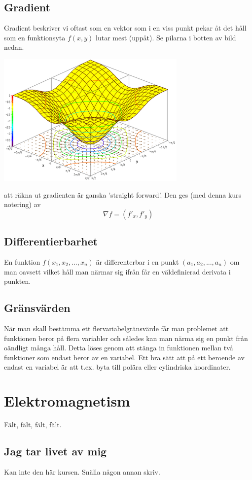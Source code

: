 \documentclass[10pt,a4paper]{article}
\begin{document}
\subsection{Gradient}
Gradient beskriver vi oftast som en vektor som i en viss punkt pekar åt det håll som en funktionsyta $f(x,y)$ lutar mest (uppåt). Se pilarna i botten av bild nedan.
\begin{center}
\includegraphics[scale=0.5]{gradient}
\end{center}
att räkna ut gradienten är ganska 'straight forward'. Den ges (med denna kurs notering) av
\begin{equation}
\nabla f = (f'_x,f'_y)
\end{equation}

\subsection{Differentierbarhet}
En funktion $f(x_1,x_2,...,x_n)$ är differenterbar i en punkt $(a_1,a_2,...,a_n)$ om man oavsett vilket håll man närmar sig ifrån får en väldefinierad derivata i punkten.

\subsection{Gränsvärden}
När man skall bestämma ett flervariabelgränsvärde får man problemet att funktionen beror på flera variabler och således kan man närma sig en punkt från oändligt många håll. Detta löses genom att stänga in funktionen mellan två funktioner som endast beror av en variabel. Ett bra sätt att på ett beroende av endast en variabel är att t.ex. byta till polära eller cylindriska koordinater.

\section{Elektromagnetism}
Fält, fält, fält, fält.
\subsection{Jag tar livet av mig}
Kan inte den här kursen. Snälla någon annan skriv.
\end{document}
